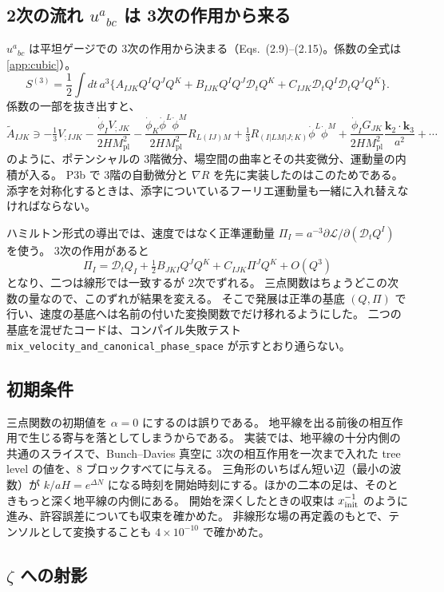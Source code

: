 \documentclass[a4paper,11pt]{ltjsarticle}
\newcommand{\Mpl}{M_{\mathrm{pl}}}
\newcommand{\code}[1]{\texttt{#1}}
\newcommand{\Dt}{\mathcal{D}_t}
\begin{document}
\subsection{2次の流れ \texorpdfstring{$u^a{}_{bc}$}{u\^{}a\_bc} は 3次の作用から来る}
\label{sec:canonical}

$u^a{}_{bc}$ は平坦ゲージでの 3次の作用\cite{BS2018}から決まる（Eqs.~(2.9)--(2.15)。係数の全式は\ref{app:cubic}）。
\[
S^{(3)}=\frac12\int dt\,a^3\Big\{A_{IJK}Q^IQ^JQ^K+B_{IJK}Q^IQ^J\Dt Q^K+C_{IJK}\Dt Q^I\Dt Q^JQ^K\Big\}.
\]
係数の一部を抜き出すと、
\[
\widetilde A_{IJK}\ni-\tfrac13V_{;IJK}-\frac{\dot\phi_IV_{;JK}}{2H\Mpl^2}
-\frac{\dot\phi_K\dot\phi^L\dot\phi^M}{2H\Mpl^2}R_{L(IJ)M}+\tfrac13R_{(I|LM|J;K)}\dot\phi^L\dot\phi^M
+\frac{\dot\phi_IG_{JK}}{2H\Mpl^2}\frac{\mathbf k_2\cdot\mathbf k_3}{a^2}+\cdots
\]
のように、ポテンシャルの 3階微分、場空間の曲率とその共変微分、運動量の内積が入る。
P3b で 3階の自動微分と $\nabla R$ を先に実装したのはこのためである。
添字を対称化するときは、添字についているフーリエ運動量も一緒に入れ替えなければならない。

ハミルトン形式の導出では、速度ではなく正準運動量 $\Pi_I=a^{-3}\partial\mathcal L/\partial(\Dt Q^I)$ を使う。
3次の作用があると
\[
\Pi_I=\Dt Q_I+\tfrac12B_{JKI}Q^JQ^K+C_{IJK}\Pi^JQ^K+O(Q^3)
\]
となり、二つは線形では一致するが 2次でずれる。
三点関数はちょうどこの次数の量なので、このずれが結果を変える。
そこで発展は正準の基底 $(Q,\Pi)$ で行い、速度の基底へは名前の付いた変換関数でだけ移れるようにした。
二つの基底を混ぜたコードは、コンパイル失敗テスト \code{mix\_velocity\_and\_canonical\_phase\_space} が示すとおり通らない。

\subsection{初期条件}

三点関数の初期値を $\alpha=0$ にするのは誤りである。
地平線を出る前後の相互作用で生じる寄与を落としてしまうからである。
実装では、地平線の十分内側の共通のスライスで、Bunch--Davies 真空に 3次の相互作用を一次まで入れた tree level の値を、8 ブロックすべてに与える。
三角形のいちばん短い辺（最小の波数）が $k/aH=e^{\Delta N}$ になる時刻を開始時刻にする。ほかの二本の足は、そのときもっと深く地平線の内側にある。
開始を深くしたときの収束は $x_{\rm init}^{-1}$ のように進み、許容誤差についても収束を確かめた。
非線形な場の再定義のもとで、テンソルとして変換することも $4\times10^{-10}$ で確かめた。

\subsection{\texorpdfstring{$\zeta$}{ζ} への射影}
\label{sec:projection}
\end{document}
